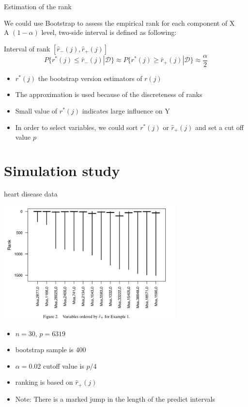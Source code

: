 \documentclass[ignorenonframetext,]{beamer}
\providecommand{\tightlist}{%
  \setlength{\itemsep}{0pt}\setlength{\parskip}{0pt}}
\begin{document}
\begin{frame}{Estimation of the rank}

We could use Bootstrap to assess the empirical rank for each component
of X\\
A \((1-\alpha)\) level, two-side interval is defined as following:

\begin{block}{Interval of rank $[\hat{r}_{-}(j), \hat{r}_{+}(j)]$}
\[
  P\{r^*(j)\leq \hat{r}_{-}(j)|\mathcal{D}\} \approx P\{r^*(j)\geq \hat{r}_{+}(j)|\mathcal{D}\} \approx \frac{\alpha}{2}
\]
\end{block}

\begin{itemize}
\tightlist
\item
  \(r^*(j)\) the bootstrap version estimators of \(r(j)\)
\item
  The approximation is used because of the discreteness of ranks
\item
  Small value of \(r^*(j)\) indicates large influence on Y
\item
  In order to select variables, we could sort \(r^*(j)\) or
  \(\hat{r}_{+}(j)\) and set a cut off value \(p\)
\end{itemize}

\end{frame}

\section{Simulation study}\label{simulation-study}

\begin{frame}{heart disease data}

\includegraphics[width=0.70000\textwidth]{./figure/rank_heart_diseas.png}

\begin{itemize}
\tightlist
\item
  \(n =30\), \(p = 6319\)
\item
  bootstrap sample is 400
\item
  \(\alpha = 0.02\) cutoff value is \(p/4\)
\item
  ranking is based on \(\hat{r}_{+}(j)\)
\item
  Note: There is a marked jump in the length of the predict intervals
\end{itemize}

\end{frame}
\end{document}

